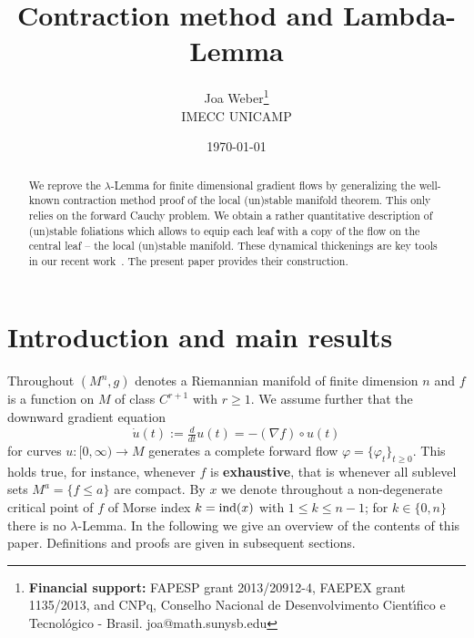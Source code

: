 \documentclass{article}
\title{Contraction method and Lambda-Lemma
       }
\author{Joa Weber\footnote{
        {\bf Financial support:}
        FAPESP grant 2013/20912-4, FAEPEX grant 1135/2013,
        and CNPq, Conselho Nacional de Desenvolvimento Cient\'{\i}fico
        e Tecnol\'ogico - Brasil.
  \hfill
%
  \newline
%
  joa@math.sunysb.edu
        }
        \\
        IMECC UNICAMP }
\date{\today}
\begin{document}
\maketitle %

\begin{abstract}
We reprove the $\lambda$-Lemma for
finite dimensional gradient flows by generalizing the
well-known contraction method proof of the
local (un)stable manifold theorem.
This only relies on the forward Cauchy problem. We obtain
a rather quantitative description of (un)stable foliations
which allows to equip each leaf with a copy of the flow
on the central leaf -- the local (un)stable manifold.
These dynamical thickenings are key tools in our recent work~\cite{weber:2014e}.
The present paper provides their construction.
\end{abstract}%

\tableofcontents




%
%
%
%
%
%




\section{Introduction and main results}\label{sec:intro}
Throughout $(M^n,g)$ denotes a Riemannian manifold of
finite dimension $n$ and $f$ is a function on $M$ of class
$C^{r+1}$ with $r\ge 1$. We assume further that the downward gradient equation
\begin{equation}\label{eq:DGE}
     \dot u(t):=\tfrac{d}{dt} u(t)
     =-(\nabla f)\circ u(t)
\end{equation}
for curves $u:[0,\infty)\to M$ generates a complete forward flow
$\varphi=\{\varphi_t\}_{t\ge 0}$. This holds true,
for instance, whenever $f$ is {\bf exhaustive}, that is whenever
all sublevel sets $M^a=\{f\le a\}$ are compact.
By $x$ we denote throughout a non-degenerate critical point of $f$
of Morse index $k={\rm ind}(x)$ with $1\le k\le n-1$; for $k\in\{0,n\}$
there is no $\lambda$-Lemma.
%
In the following we give an overview of the contents of this paper.
Definitions and proofs are given in subsequent sections.
\end{document}
